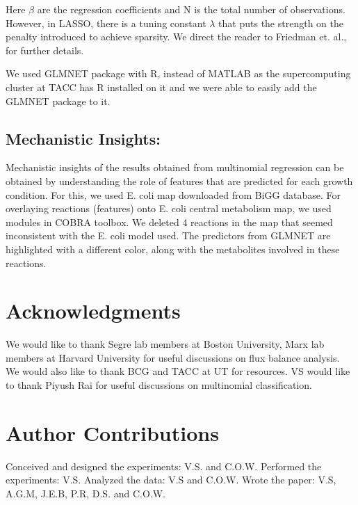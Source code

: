 \documentclass[12pt]{article}
\begin{document}
\noindent
Here $\beta$ are the regression coefficients and N is the total number of observations. However, in LASSO, there is a tuning constant $\lambda$ that puts the strength on the penalty introduced to achieve sparsity. We direct the reader to Friedman et. al., \cite{Friedmanetal2008} for further details.

\bigskip
\noindent
We used GLMNET package with R, instead of MATLAB as the supercomputing cluster at TACC has R installed on it and we were able to easily add the GLMNET package to it.

\subsection*{Mechanistic Insights:} 
Mechanistic insights of the results obtained from multinomial regression can be obtained by understanding the role of features that are predicted for each growth condition. For this, we used E. coli map downloaded from BiGG database. For overlaying reactions (features) onto E. coli central metabolism map, we used modules in COBRA toolbox. We deleted 4 reactions in the map that seemed inconsistent with the E. coli model used. The predictors from GLMNET are highlighted with a different color, along with the metabolites involved in these reactions.


\section*{Acknowledgments}
We would like to thank Segre lab members at Boston University, Marx lab members at Harvard University for useful discussions on flux balance analysis. We would also like to thank BCG and TACC at UT for resources. VS would like to thank Piyush Rai for useful discussions on multinomial classification.

\section*{Author Contributions}
Conceived and designed the experiments: V.S. and C.O.W. Performed the experiments: V.S. Analyzed the data: V.S and C.O.W. Wrote the paper: V.S,  A.G.M, J.E.B, P.R, D.S. and C.O.W.


\end{document}
